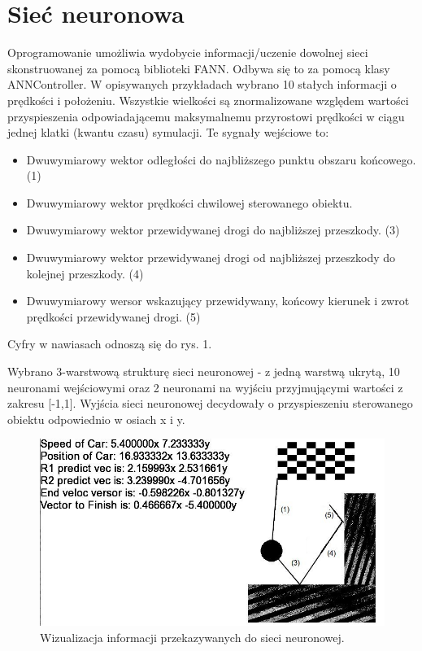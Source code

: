 \documentclass{article}
\begin{document}
\section{Sieć neuronowa}
\indent Oprogramowanie umożliwia wydobycie informacji/uczenie dowolnej sieci skonstruowanej za pomocą biblioteki FANN. Odbywa się to za pomocą klasy ANNController. W opisywanych przykładach wybrano 10 stałych informacji o prędkości i położeniu. Wszystkie wielkości są znormalizowane względem wartości przyspieszenia odpowiadającemu maksymalnemu przyrostowi prędkości w ciągu jednej klatki (kwantu czasu) symulacji. Te sygnały wejściowe to:
\begin{itemize}
	\item Dwuwymiarowy wektor odległości do najbliższego punktu obszaru końcowego. (1)
	\item Dwuwymiarowy wektor prędkości chwilowej sterowanego obiektu. 
	\item Dwuwymiarowy wektor przewidywanej drogi do najbliższej przeszkody. (3)
	\item Dwuwymiarowy wektor przewidywanej drogi od najbliższej przeszkody do kolejnej przeszkody. (4)
	\item Dwuwymiarowy wersor wskazujący przewidywany, końcowy kierunek i zwrot prędkości przewidywanej drogi. (5)
\end{itemize}

Cyfry w nawiasach odnoszą się do rys. 1.

Wybrano 3-warstwową strukturę sieci neuronowej - z jedną warstwą ukrytą, 10 neuronami wejściowymi oraz 2 neuronami na wyjściu przyjmującymi wartości z zakresu [-1,1]. Wyjścia sieci neuronowej decydowały o przyspieszeniu sterowanego obiektu odpowiednio w osiach x i y.

\begin{figure}
	\includegraphics[width=\textwidth]{rys1.jpg}
	\caption{Wizualizacja informacji przekazywanych do sieci neuronowej.}
\end{figure}
\end{document}
